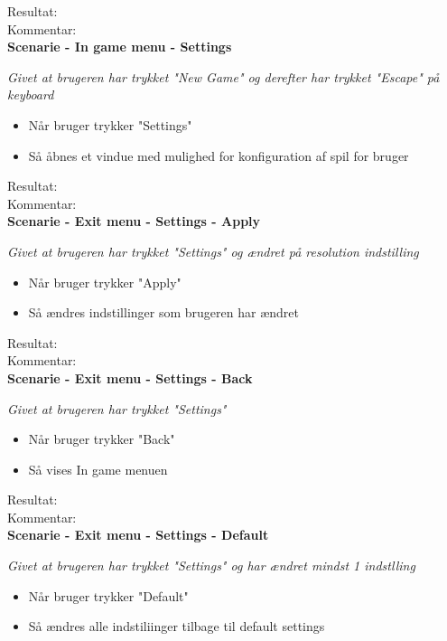 Resultat:\\
Kommentar:\\

\textbf{Scenarie - In game menu - Settings}

\textit{Givet at brugeren har trykket "New Game" og derefter har trykket "Escape" på keyboard}

\begin{itemize}
  \item Når bruger trykker "Settings"
  \item Så åbnes et vindue med mulighed for konfiguration af spil for bruger
\end{itemize}

Resultat:\\
Kommentar:\\

\textbf{Scenarie - Exit menu - Settings - Apply}

\textit{Givet at brugeren har trykket "Settings" og ændret på resolution indstilling}

\begin{itemize}
  \item Når bruger trykker "Apply"
  \item Så ændres indstillinger som brugeren har ændret
\end{itemize}

Resultat:\\
Kommentar:\\

\textbf{Scenarie - Exit menu - Settings - Back}

\textit{Givet at brugeren har trykket "Settings"}

\begin{itemize}
  \item Når bruger trykker "Back"
  \item Så vises In game menuen
\end{itemize}

Resultat:\\
Kommentar:\\

\textbf{Scenarie - Exit menu - Settings - Default}

\textit{Givet at brugeren har trykket "Settings" og har ændret mindst 1 indstlling}

\begin{itemize}
  \item Når bruger trykker "Default"
  \item Så ændres alle indstiliinger tilbage til default settings
\end{itemize}

